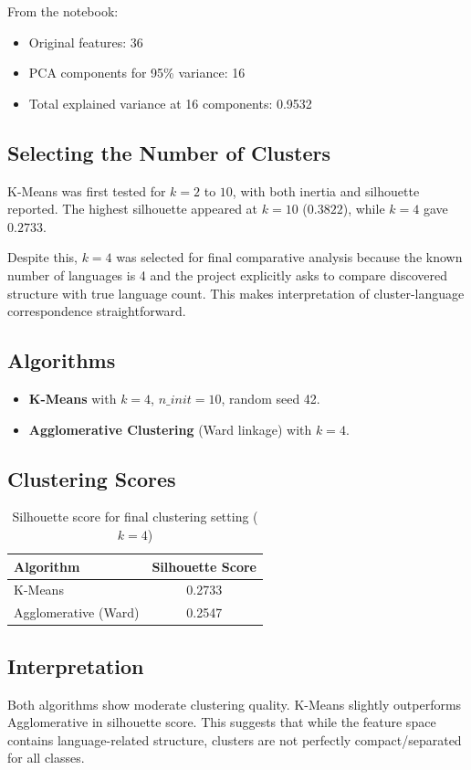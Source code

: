 \documentclass[a4paper,14pt]{extarticle}
\begin{document}
From the notebook:
\begin{itemize}
    \item Original features: 36
    \item PCA components for 95\% variance: 16
    \item Total explained variance at 16 components: 0.9532
\end{itemize}

\subsection{Selecting the Number of Clusters}
K-Means was first tested for \(k = 2\) to \(10\), with both inertia and silhouette reported. The highest silhouette appeared at \(k=10\) (\(0.3822\)), while \(k=4\) gave \(0.2733\). 

Despite this, \(k=4\) was selected for final comparative analysis because the known number of languages is 4 and the project explicitly asks to compare discovered structure with true language count. This makes interpretation of cluster-language correspondence straightforward.

\subsection{Algorithms}
\begin{itemize}
    \item \textbf{K-Means} with \(k=4\), \(n\_init=10\), random seed 42.
    \item \textbf{Agglomerative Clustering} (Ward linkage) with \(k=4\).
\end{itemize}

\subsection{Clustering Scores}
\begin{table}[h]
    \centering
    \caption{Silhouette score for final clustering setting (\(k=4\))}
    \begin{tabular}{|l|c|}
        \hline
        Algorithm & Silhouette Score \\
        \hline
        K-Means & 0.2733 \\
        Agglomerative (Ward) & 0.2547 \\
        \hline
    \end{tabular}
    \label{tab:silhouette_results}
\end{table}

\subsection{Interpretation}
Both algorithms show moderate clustering quality. K-Means slightly outperforms Agglomerative in silhouette score. This suggests that while the feature space contains language-related structure, clusters are not perfectly compact/separated for all classes.
\end{document}
